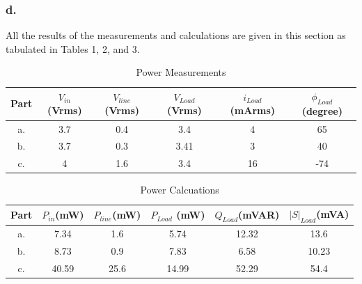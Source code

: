 \documentclass[letterpaper,12pt]{article}
\begin{document}
\subsubsection{d.}
All the results of the measurements and calculations are given in this section as tabulated in Tables 1, 2, and 3.
\begin{table}[H]
    \begin{center}
        \caption{Power Measurements}
        \vspace{2mm}
        \begin{tabular}{||c | c | c | c | c | c ||} 
            \hline
            Part & \(V_{in}\)\newline (Vrms) & \(V_{line}\)\newline (Vrms) & \(V_{Load}\) \newline (Vrms) &\(i_{Load}\)\newline (mArms) & \(\phi_{Load}\)\newline(degree) \\ [0.5ex] 
            \hline\hline
            a. & 3.7 & 0.4   & 3.4 & 4& 65   \\ 
            \hline
            b. &3.7 &0.3  &3.41 &  3 & 40    \\
            \hline
            c. &4 &1.6  &3.4 &16 &-74  \\ [1ex] 
            \hline
        \end{tabular}
\end{center}
\end{table}


\begin{table}[H]
    \begin{center}
        \caption{Power Calcuations}
        \vspace{2mm}
        \begin{tabular}{||c | c | c | c | c | c ||} 
            \hline
            Part & \(P_{in}\)\newline (mW) & \(P_{line}\)\newline (mW) & \(P_{Load}\) \newline (mW) &\(Q_{Load}\)\newline (mVAR) & \(|S|_{Load}\)\newline(mVA)   \\ [0.5ex] 
            \hline\hline
            a. &7.34 & 1.6 & 5.74 & 12.32 & 13.6   \\ 
            \hline
            b. &8.73 & 0.9 & 7.83 & 6.58 &  10.23   \\
            \hline
            c. & 40.59 & 25.6 & 14.99 & 52.29  & 54.4   \\ [1ex] 
            \hline
        \end{tabular}
\end{center}
\end{table}
\end{document}
